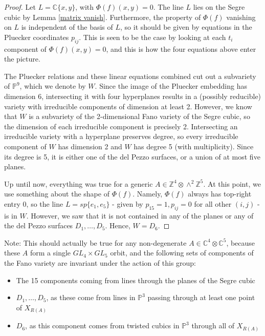 \documentclass{report}
\begin{document}
\begin{proof}
Let $L = \mathbb{C}\{x,y\}$, with $\Phi(f)(x,y) = 0$.  The line $L$ lies on the Segre cubic by Lemma \ref{matrix vanish}.  Furthermore, the property of $\Phi(f)$ vanishing on $L$ is independent of the basis of $L$, so it should be given by equations in the Pluecker coordinates $p_{ij}$.  This is seen to be the case by looking at each $t_i$ component of $\Phi(f)(x,y) = 0$, and this is how the four equations above enter the picture.

The Pluecker relations and these linear equations combined cut out a subvariety of $\mathbb{P}^9$, which we denote by $W$.  Since the image of the Pluecker embedding has dimension 6, intersecting it with four hyperplanes results in a (possibly reducible) variety with irreducible components of dimension at least 2.  However, we know that $W$ is a subvariety of the 2-dimensional Fano variety of the Segre cubic, so the dimension of each irreducible component is precisely 2.  Intersecting an irreducible variety with a hyperplane preserves degree, so every irreducible component of $W$ has dimension 2 and $W$ has degree 5 (with multiplicity).  Since its degree is 5, it is either one of the del Pezzo surfaces, or a union of at most five planes.

Up until now, everything was true for a generic $A \in \mathbb{Z}^4 \otimes \wedge^2 \mathbb{Z}^5$.  At this point, we use something about the shape of $\Phi(f)$.  Namely, $\Phi(f)$ always has top-right entry 0, so the line $L = sp \{e_1, e_5 \}$ - given by $p_{15} = 1, p_{ij} = 0$ for all other $(i,j)$ - is in $W$.  However, we saw that it is not contained in any of the planes or any of the del Pezzo surfaces $D_1, \ldots, D_5$.  Hence, $W = D_6$.
\end{proof}

Note: This should actually be true for any non-degenerate $A \in \mathbb{C}^4 \otimes \mathbb{C}^5$, because these $A$ form a single $GL_4 \times GL_5$ orbit, and the following sets of components of the Fano variety are invariant under the action of this group:
\begin{itemize}
\item The 15 components coming from lines through the planes of the Segre cubic
\item $D_1, \ldots, D_5$, as these come from lines in $\mathbb{P}^3$ passing through at least one point of $X_{R(A)}$
\item $D_6$, as this component comes from twisted cubics in $\mathbb{P}^3$ through all of $X_{R(A)}$
\end{itemize}
\end{document}
